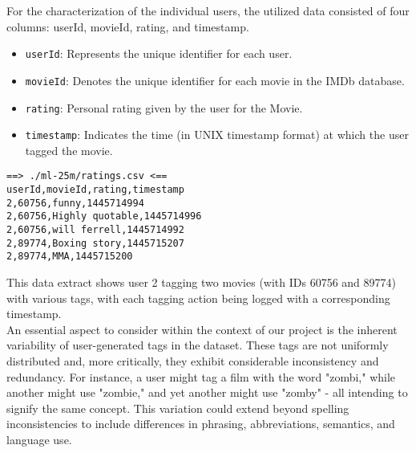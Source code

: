 





For the characterization of the individual users, the utilized data consisted of four columns: userId, movieId, rating, and timestamp.

\begin{itemize}
\item \texttt{userId}: Represents the unique identifier for each user.
\item \texttt{movieId}: Denotes the unique identifier for each movie in the IMDb database.
\item \texttt{rating}: Personal rating given by the user for the Movie.
\item \texttt{timestamp}: Indicates the time (in UNIX timestamp format) at which the user tagged the movie.
\end{itemize}

\begin{verbatim}
==> ./ml-25m/ratings.csv <==
userId,movieId,rating,timestamp
2,60756,funny,1445714994
2,60756,Highly quotable,1445714996
2,60756,will ferrell,1445714992
2,89774,Boxing story,1445715207
2,89774,MMA,1445715200
\end{verbatim}

This data extract shows user 2 tagging two movies (with IDs 60756 and 89774) with various tags, with each tagging action being logged with a corresponding timestamp.\\

An essential aspect to consider within the context of our project is the inherent variability of user-generated tags in the dataset. These tags are not uniformly distributed and, more critically, they exhibit considerable inconsistency and redundancy. For instance, a user might tag a film with the word "zombi," while another might use "zombie," and yet another might use "zomby" - all intending to signify the same concept. This variation could extend beyond spelling inconsistencies to include differences in phrasing, abbreviations, semantics, and language use.

